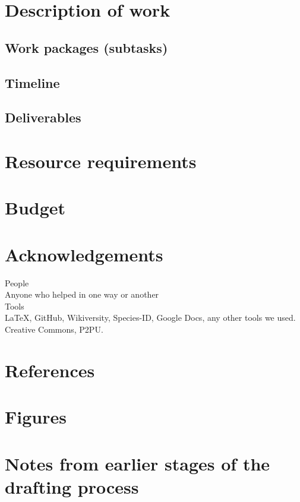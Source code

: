 \documentclass[final,authoryear,3p]{elsarticle-open-drafting}
\begin{document}
\section{Description of work}
\subsection{Work packages (subtasks)}
\subsection{Timeline}
\subsection{Deliverables}

\section{Resource requirements}
\section{Budget}
\section{Acknowledgements}
People\\
Anyone who helped in one way or another\\

Tools\\
\LaTeX, GitHub, Wikiversity, Species-ID, Google Docs, any other tools we used.
Creative Commons, P2PU.

\section{References}

\section{Figures}

\section{Notes from earlier stages of the drafting process}
\end{document}
